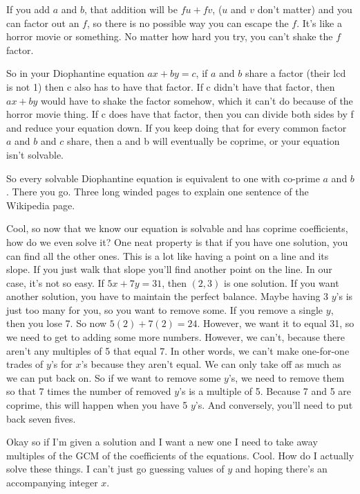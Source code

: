 \documentclass{article}
\begin{document}
    If you add $a$ and $b$, that addition will be $fu + fv$, ($u$ and $v$ don't matter) and you can factor out an $f$, so there is no possible way you can escape the $f$.
    It's like a horror movie or something.
    No matter how hard you try, you can't shake the $f$ factor.

    So in your Diophantine equation $ax + by = c$, if $a$ and $b$ share a factor (their lcd is not 1) then c also has to have that factor.
    If c didn't have that factor, then $ax + by$ would have to shake the factor somehow, which it can't do because of the horror movie thing.
    If c does have that factor, then you can divide both sides by f and reduce your equation down.
    If you keep doing that for every common factor $a$ and $b$ and $c$ share, then a and b will eventually be coprime, or your equation isn't solvable.

    So every solvable Diophantine equation is equivalent to one with co-prime $a$ and $b$.
    There you go. Three long winded pages to explain one sentence of the Wikipedia page.

    Cool, so now that we know our equation is solvable and has coprime coefficients, how do we even solve it?
    One neat property is that if you have one solution, you can find all the other ones.
    This is a lot like having a point on a line and its slope.
    If you just walk that slope you'll find another point on the line.
    In our case, it's not so easy.
    If $5x + 7y = 31$, then $(2, 3)$ is one solution.
    If you want another solution, you have to maintain the perfect balance.
    Maybe having 3 $y$'s is just too many for you, so you want to remove some.
    If you remove a single $y$, then you lose 7.
    So now $5(2) + 7(2) = 24$.
    However, we want it to equal 31, so we need to get to adding some more numbers.
    However, we can't, because there aren't any multiples of 5 that equal 7.
    In other words, we can't make one-for-one trades of $y$'s for $x$'s because they aren't equal.
    We can only take off as much as we can put back on.
    So if we want to remove some $y$'s, we need to remove them so that 7 times the number of removed $y$'s is a multiple of 5.
    Because 7 and 5 are coprime, this will happen when you have 5 $y$'s.
    And conversely, you'll need to put back seven fives.

    Okay so if I'm given a solution and I want a new one I need to take away multiples of the GCM of the coefficients of the equations.
    Cool.
    How do I actually solve these things.
    I can't just go guessing values of $y$ and hoping there's an accompanying integer $x$.

    
\end{document}
